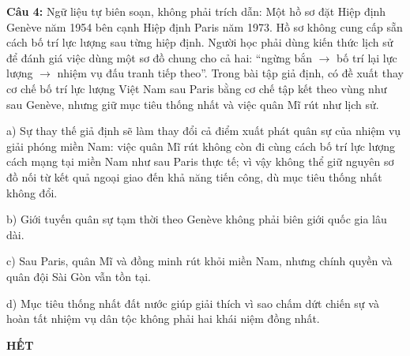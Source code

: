 \documentclass[12pt,a4paper]{article}
\begin{document}
\par\noindent\begin{minipage}{\linewidth}
\noindent\textbf{Câu 4:} Ngữ liệu tự biên soạn, không phải trích dẫn: Một hồ sơ đặt Hiệp định Genève năm 1954 bên cạnh Hiệp định Paris năm 1973. Hồ sơ không cung cấp sẵn cách bố trí lực lượng sau từng hiệp định. Người học phải dùng kiến thức lịch sử để đánh giá việc dùng một sơ đồ chung cho cả hai: “ngừng bắn \(\rightarrow\) bố trí lại lực lượng \(\rightarrow\) nhiệm vụ đấu tranh tiếp theo”. Trong bài tập giả định, có đề xuất thay cơ chế bố trí lực lượng Việt Nam sau Paris bằng cơ chế tập kết theo vùng như sau Genève, nhưng giữ mục tiêu thống nhất và việc quân Mĩ rút như lịch sử.\par
\noindent a) Sự thay thế giả định sẽ làm thay đổi cả điểm xuất phát quân sự của nhiệm vụ giải phóng miền Nam: việc quân Mĩ rút không còn đi cùng cách bố trí lực lượng cách mạng tại miền Nam như sau Paris thực tế; vì vậy không thể giữ nguyên sơ đồ nối từ kết quả ngoại giao đến khả năng tiến công, dù mục tiêu thống nhất không đổi.\par
\noindent b) Giới tuyến quân sự tạm thời theo Genève không phải biên giới quốc gia lâu dài.\par
\noindent c) Sau Paris, quân Mĩ và đồng minh rút khỏi miền Nam, nhưng chính quyền và quân đội Sài Gòn vẫn tồn tại.\par
\noindent d) Mục tiêu thống nhất đất nước giúp giải thích vì sao chấm dứt chiến sự và hoàn tất nhiệm vụ dân tộc không phải hai khái niệm đồng nhất.\par
\end{minipage}\par\vspace{0.12cm}
\begin{center}\textbf{HẾT}\end{center}
\end{document}
